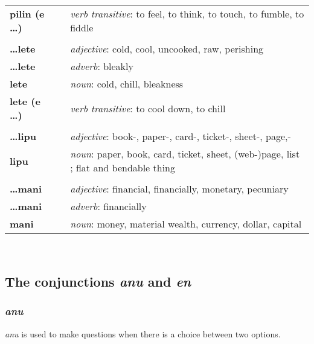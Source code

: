 \begin{supertabular}{p{2,5cm}|ll}
\textbf{pilin (e \dots)} && \textit{verb transitive}: to feel, to think, to touch, to fumble, to fiddle \\ %
 && \\ %
\textbf{\dots lete} && \textit{adjective}: cold, cool, uncooked, raw, perishing \\ %
\textbf{\dots lete} && \textit{adverb}: bleakly \\ %
\textbf{lete} && \textit{noun}: cold, chill, bleakness \\ %
\textbf{lete (e \dots)} && \textit{verb transitive}: to cool down, to chill \\ %
 && \\ %
\textbf{\dots lipu} && \textit{adjective}: book-, paper-, card-, ticket-, sheet-, page,- \\ %
\textbf{lipu} && \textit{noun}: paper, book, card, ticket, sheet, (web-)page, list ; flat and bendable thing \\ %
 && \\ %
\textbf{\dots mani} && \textit{adjective}: financial, financially, monetary, pecuniary \\ %
\textbf{\dots mani} && \textit{adverb}: financially \\ %
\textbf{mani} && \textit{noun}: money, material wealth, currency, dollar, capital \\ %
\end{supertabular} \\
% 
\newpage
\subsection*{The conjunctions \textit{anu} and \textit{en}}
%
\subsubsection*{\textit{anu}}
%
\textit{anu} is used to make questions when there is a choice between two options. 

